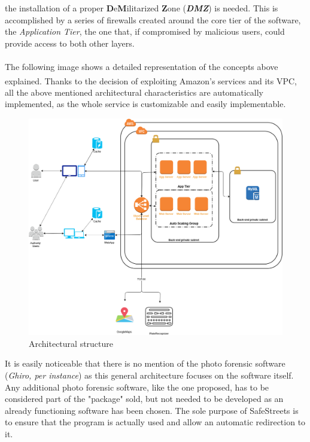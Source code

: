     the installation of a proper \textbf{D}e\textbf{M}ilitarized \textbf{Z}one
    (\textbf{\emph{DMZ}}) is needed. This is accomplished by a series of
    firewalls created around the core tier of the software, the
    \emph{Application Tier}, the one that, if compromised by malicious users,
    could provide access to both other layers.\\ 
    \\ 
    The following image shows a detailed representation of the concepts above
    explained. Thanks to the decision of exploiting
    Amazon\textsuperscript{\textcopyright}'s services and its VPC, all the above
    mentioned architectural characteristics are automatically implemented, as
    the whole service is customizable and easily implementable.

    \begin{figure}[H]
        \includegraphics[scale=0.3]{dd/resources/images/ArchitecturalStructure.png}
        \caption{Architectural structure} 
    \end{figure}

    It is easily noticeable that there is no mention of the photo forensic
    software (\emph{Ghiro, per instance}) as this general architecture focuses
    on the software itself. Any additional photo forensic software, like the one
    proposed, has to be considered part of the "package" sold, but not needed to
    be developed as an already functioning software has been chosen. The sole
    purpose of SafeStreets is to ensure that the program is actually used and
    allow an automatic redirection to it. 

